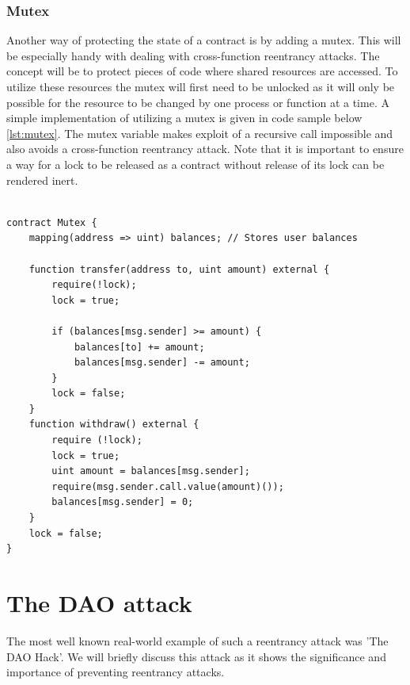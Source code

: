 \documentclass[sigconf]{acmart}
\begin{document}
\subsubsection{Mutex}
Another way of protecting the state of a contract is by adding a mutex. This will be especially handy with dealing with cross-function reentrancy attacks. The concept will be to protect pieces of code where shared resources are accessed. To utilize these resources the mutex will first need to be unlocked as it will only be possible for the resource to be changed by one process or function at a time. A simple implementation of utilizing a mutex is given in code sample below \ref{lst:mutex}. The mutex variable makes exploit of a recursive call impossible and also avoids a cross-function reentrancy attack. Note that it is important to ensure a way for a lock to be released as a contract without release of its lock can be rendered inert. 

\begin{lstlisting}[language=Solidity, caption=Mutual exclusion, label={lst:mutex}]

contract Mutex {
    mapping(address => uint) balances; // Stores user balances

    function transfer(address to, uint amount) external {
        require(!lock);
        lock = true;
        
        if (balances[msg.sender] >= amount) {
            balances[to] += amount;
            balances[msg.sender] -= amount;
        }
        lock = false;
    }
    function withdraw() external {
        require (!lock);
        lock = true;
        uint amount = balances[msg.sender];
        require(msg.sender.call.value(amount)());
        balances[msg.sender] = 0;
    }
    lock = false;
}
\end{lstlisting}
\section{The DAO attack}
The most well known real-world example of such a reentrancy attack was 'The DAO Hack'. We will briefly discuss this attack as it shows the significance and importance of preventing reentrancy attacks.
\end{document}
